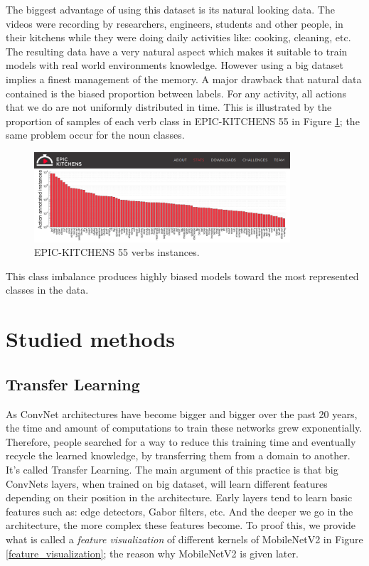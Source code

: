 \documentclass[12pt, a4paper]{report}
\begin{document}
				The biggest advantage of using this dataset is its natural looking data.
				The videos were recording by researchers, engineers, students and other people, in their kitchens while they were doing daily activities like: cooking, cleaning, etc.
				The resulting data have a very natural aspect which makes it suitable to train models with real world environments knowledge.
				However using a big dataset implies a finest management of the memory.%
				A major drawback that natural data contained is the biased proportion between labels.
				For any activity, all actions that we do are not uniformly distributed in time.
				This is illustrated by the proportion of samples of each verb class in EPIC-KITCHENS 55 in Figure \ref{epic_55_imbalance}; the same problem occur for the noun classes.
				\begin{figure}[h!]
					\centering
					\includegraphics[width=0.85\textwidth]{EPIC-55 data imbalance.png}
					\caption{EPIC-KITCHENS 55 verbs instances.}
					\label{epic_55_imbalance}
				\end{figure}
				This class imbalance produces highly biased models toward the most represented classes in the data.
		\section{Studied methods}
			\subsection{Transfer Learning}
				As ConvNet architectures have become bigger and bigger over the past 20 years, the time and amount of computations to train these networks grew exponentially.
				Therefore, people searched for a way to reduce this training time and eventually recycle the learned knowledge, by transferring them from a domain to another.
				It's called Transfer Learning.
				The main argument of this practice is that big ConvNets layers, when trained on big dataset, will learn different features depending on their position in the architecture.
				Early layers tend to learn basic features such as: edge detectors, Gabor filters, etc.
				And the deeper we go in the architecture, the more complex these features become.
				To proof this, we provide what is called a {\itshape feature visualization} of different kernels of MobileNetV2 in Figure \ref{feature_visualization}; the reason why MobileNetV2 is given later.
\end{document}
